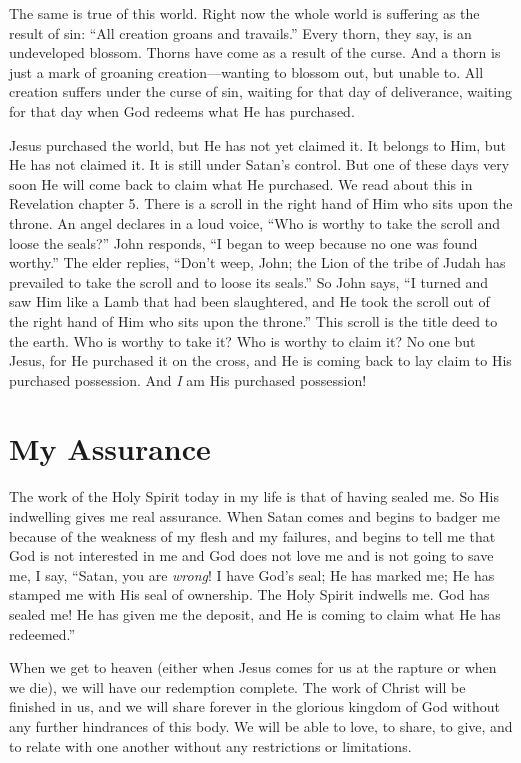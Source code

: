 The same is true of this world. Right now the whole 
world is suffering as the result of sin: “All creation groans 
and travails.” Every thorn, they say, is an undeveloped blossom. Thorns have come as a result of the curse. And a thorn 
is just a mark of groaning creation—wanting to blossom 
out, but unable to. All creation suffers under the curse of 
sin, waiting for that day of deliverance, waiting for that day 
when God redeems what He has purchased.

Jesus purchased the world, but He has not yet claimed 
it. It belongs to Him, but He has not claimed it. It is still 
under Satan’s control. But one of these days very soon He 
will come back to claim what He purchased. We read about 
this in Revelation chapter 5. There is a scroll in the right 
hand of Him who sits upon the throne. An angel declares 
in a loud voice, “Who is worthy to take the scroll and loose 
the seals?” John responds, “I began to weep because no one 
was found worthy.” The elder replies, “Don’t weep, John;
the Lion of the tribe of Judah has prevailed to take the scroll 
and to loose its seals.” So John says, “I turned and saw 
Him like a Lamb that had been slaughtered, and He took 
the scroll out of the right hand of Him who sits upon the 
throne.” This scroll is the title deed to the earth. Who is 
worthy to take it? Who is worthy to claim it? No one but 
Jesus, for He purchased it on the cross, and He is coming 
back to lay claim to His purchased possession. And \emph{I} am His 
purchased possession!


\section*{My Assurance}

The work of the Holy Spirit today in my life is that of 
having sealed me. So His indwelling gives me real assurance. When Satan comes and begins to badger me because 
of the weakness of my flesh and my failures, and begins 
to tell me that God is not interested in me and God does 
not love me and is not going to save me, I say, “Satan, 
you are \emph{wrong}! I have God’s seal; He has marked me; He 
has stamped me with His seal of ownership. The Holy 
Spirit indwells me. God has sealed me! He has given 
me the deposit, and He is coming to claim what He has 
redeemed.”

When we get to heaven (either when Jesus comes for us 
at the rapture or when we die), we will have our redemption complete. The work of Christ will be finished in us, and 
we will share forever in the glorious kingdom of God without any further hindrances of this body. We will be able to 
love, to share, to give, and to relate with one another without any restrictions or limitations.

